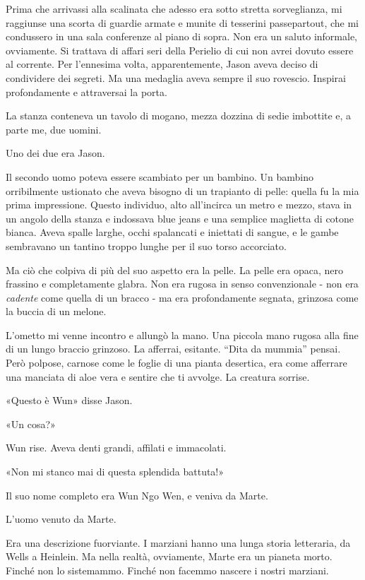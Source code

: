 Prima che arrivassi alla scalinata che adesso era sotto stretta
sorveglianza, mi raggiunse una scorta di guardie armate e munite di
tesserini passepartout, che mi condussero in una sala conferenze al
piano di sopra. Non era un saluto informale, ovviamente. Si trattava di
affari seri della Perielio di cui non avrei dovuto essere al corrente.
Per l'ennesima volta, apparentemente, Jason aveva deciso di condividere
dei segreti. Ma una medaglia aveva sempre il suo rovescio. Inspirai
profondamente e attraversai la porta.

La stanza conteneva un tavolo di mogano, mezza dozzina di sedie
imbottite e, a parte me, due uomini.

Uno dei due era Jason.

Il secondo uomo poteva essere scambiato per un bambino. Un bambino
orribilmente ustionato che aveva bisogno di un trapianto di pelle:
quella fu la mia prima impressione. Questo individuo, alto all'incirca
un metro e mezzo, stava in un angolo della stanza e indossava blue jeans
e una semplice maglietta di cotone bianca. Aveva spalle larghe, occhi
spalancati e iniettati di sangue, e le gambe sembravano un tantino
troppo lunghe per il suo torso accorciato.

Ma ciò che colpiva di più del suo aspetto era la pelle. La pelle era
opaca, nero frassino e completamente glabra. Non era rugosa in senso
convenzionale - non era \emph{cadente} come quella di un bracco - ma era
profondamente segnata, grinzosa come la buccia di un melone.

L'ometto mi venne incontro e allungò la mano. Una piccola mano rugosa
alla fine di un lungo braccio grinzoso. La afferrai, esitante. ``Dita da
mummia'' pensai. Però polpose, carnose come le foglie di una pianta
desertica, era come afferrare una manciata di aloe vera e sentire che ti
avvolge. La creatura sorrise.

«Questo è Wun» disse Jason.

«Un cosa?»

Wun rise. Aveva denti grandi, affilati e immacolati.

«Non mi stanco mai di questa splendida battuta!»

Il suo nome completo era Wun Ngo Wen, e veniva da Marte.

\separatorefiori

L'uomo venuto da Marte.

Era una descrizione fuorviante. I marziani hanno una lunga storia
letteraria, da Wells a Heinlein. Ma nella realtà, ovviamente, Marte era
un pianeta morto. Finché non lo sistemammo. Finché non facemmo nascere i
nostri marziani.

